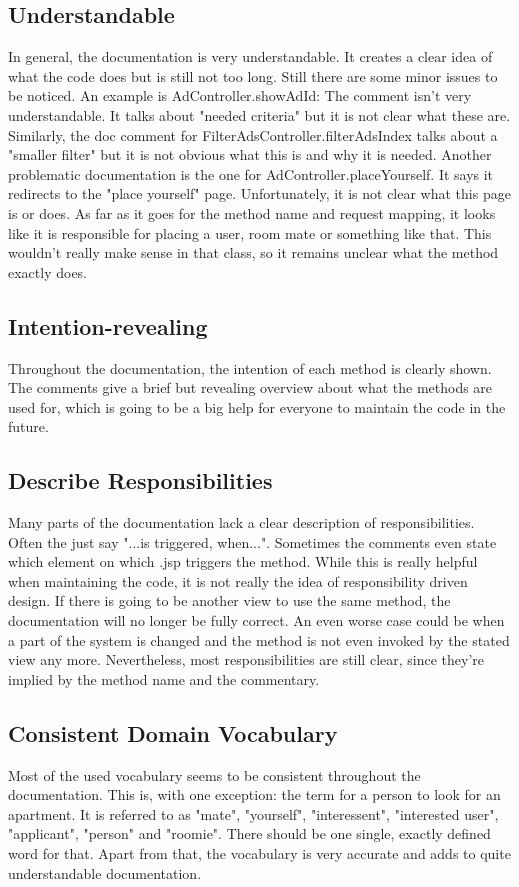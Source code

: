 \documentclass{scrreprt}
\begin{document}
\subsection{Understandable}
In general, the documentation is very understandable. It creates a clear idea of what the code does but is still not too long. Still there are some minor issues to be noticed. An example is AdController.showAdId: The comment isn't very understandable. It talks about "needed criteria" but it is not clear what these are. Similarly, the doc comment for FilterAdsController.filterAdsIndex talks about a "smaller filter" but it is not obvious what this is and why it is needed. Another problematic documentation is the one for AdController.placeYourself. It says it redirects to the "place yourself" page. Unfortunately, it is not clear what this page is or does. As far as it goes for the method name and request mapping, it looks like it is responsible for placing a user, room mate or something like that. This wouldn't really make sense in that class, so it remains unclear what the method exactly does.

\subsection{Intention-revealing}
Throughout the documentation, the intention of each method is clearly shown. The comments give a brief but revealing overview about what the methods are used for, which is going to be a big help for everyone to maintain the code in the future.

\subsection{Describe Responsibilities}
Many parts of the documentation lack a clear description of responsibilities. Often the just say "...is triggered, when...". Sometimes the comments even state which element on which .jsp triggers the method. While this is really helpful when maintaining the code, it is not really the idea of responsibility driven design. If there is going to be another view to use the same method, the documentation will no longer be fully correct. An even worse case could be when a part of the system is changed and the method is not even invoked by the stated view any more. Nevertheless, most responsibilities are still clear, since they're implied by the method name and the commentary. 

\subsection{Consistent Domain Vocabulary}
Most of the used vocabulary seems to be consistent throughout the documentation. This is, with one exception: the term for a person to look for an apartment. It is referred to as "mate", "yourself", "interessent", "interested user", "applicant", "person" and "roomie". There should be one single, exactly defined word for that. Apart from that, the vocabulary is very accurate and adds to quite understandable documentation.
\end{document}
